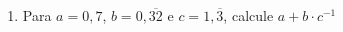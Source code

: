 \documentclass[a4paper,14pt]{article}
\begin{document}
\begin{multicols}{2}
\begin{enumerate}
			\item Para $a = 0,7$, $b = 0,\overline{32}$ e $c = 1,\overline{3}$, calcule $a + b \cdot c^{-1}$ \\\\\\\\\\\\\\\\\\\\
		\end{enumerate}
		$~$ \\ $~$ \\ $~$ \\ $~$ \\ $~$ \\ $~$ \\ $~$ \\ $~$ \\ $~$ \\ $~$ \\ $~$ \\ $~$ \\ $~$ \\ $~$ \\ $~$ \\ $~$ \\ $~$ \\ $~$ \\ $~$ \\ $~$ \\ $~$ \\ $~$ \\ $~$ \\ $~$ \\ $~$ \\ $~$ \\ $~$ \\ $~$ \\ $~$ \\ $~$ \\ $~$ \\ $~$ \\ $~$ \\ $~$ \\ $~$ \\ $~$ \\ $~$ \\ $~$ \\ $~$ \\ $~$ \\ $~$ \\ $~$ \\ $~$ \\ $~$ \\ $~$
	\end{multicols}
\end{document}
